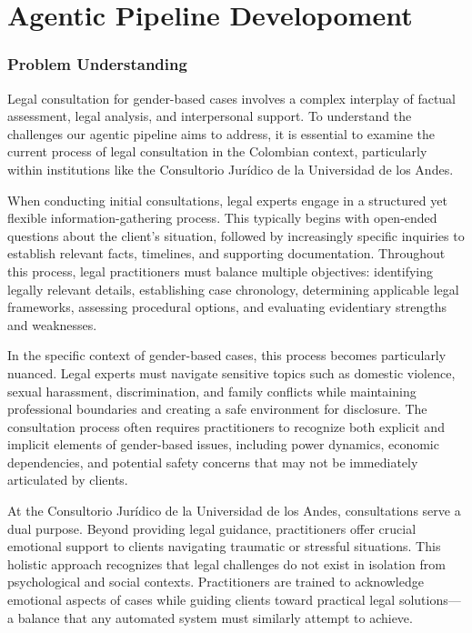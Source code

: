 \chapter{Agentic Pipeline Developoment}
\subsection{Problem Understanding}
Legal consultation for gender-based cases involves a complex interplay of factual assessment, 
legal analysis, and interpersonal support. To understand the challenges our agentic pipeline 
aims to address, it is essential to examine the current process of legal consultation in the 
Colombian context, particularly within institutions like the Consultorio Jurídico de la Universidad de los Andes.

When conducting initial consultations, legal experts engage in a structured yet flexible 
information-gathering process. This typically begins with open-ended questions about the 
client's situation, followed by increasingly specific inquiries to establish relevant facts, 
timelines, and supporting documentation. Throughout this process, legal practitioners must 
balance multiple objectives: identifying legally relevant details, establishing case chronology, 
determining applicable legal frameworks, assessing procedural options, and evaluating evidentiary 
strengths and weaknesses.

In the specific context of gender-based cases, this process becomes particularly nuanced. 
Legal experts must navigate sensitive topics such as domestic violence, sexual harassment, 
discrimination, and family conflicts while maintaining professional boundaries and creating 
a safe environment for disclosure. The consultation process often requires practitioners to 
recognize both explicit and implicit elements of gender-based issues, including power dynamics, 
economic dependencies, and potential safety concerns that may not be immediately articulated by clients.

At the Consultorio Jurídico de la Universidad de los Andes, consultations serve a dual purpose. 
Beyond providing legal guidance, practitioners offer crucial emotional support to clients navigating 
traumatic or stressful situations. This holistic approach recognizes that legal challenges do 
not exist in isolation from psychological and social contexts. Practitioners are trained to 
acknowledge emotional aspects of cases while guiding clients toward practical legal 
solutions—a balance that any automated system must similarly attempt to achieve.

